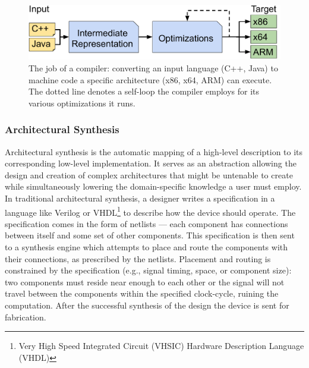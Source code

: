 \begin{figure}
        \includegraphics[width=\textwidth]{figures/compilation_process_with_ir.pdf}
    \caption{The job of a compiler: converting an input language (C++, Java) to machine code a specific architecture (x86, x64, ARM) can execute.  The dotted line denotes a self-loop the compiler employs for its various optimizations it runs.}
    \label{fig:compilation_process}
\end{figure}

\subsubsection{Architectural Synthesis}
\label{sec:synthesis}

Architectural synthesis is the automatic mapping of a high-level description to its corresponding low-level implementation.
It serves as an abstraction allowing the design and creation of complex architectures that might be untenable to create while simultaneously lowering the domain-specific knowledge a user must employ.
In traditional architectural synthesis, a designer writes a specification in a language like Verilog or VHDL\footnote{Very High Speed Integrated Circuit (VHSIC) Hardware Description Language (VHDL)} to describe how the device should operate.
The specification comes in the form of netlists --- each component has connections between itself and some set of other components.
This specification is then sent to a synthesis engine which attempts to place and route the components with their connections, as prescribed by the netlists.
Placement and routing is constrained by the specification (e.g., signal timing, space, or component size): two components must reside near enough to each other or the signal will not travel between the components within the specified clock-cycle, ruining the computation.
After the successful synthesis of the design the device is sent for fabrication.

